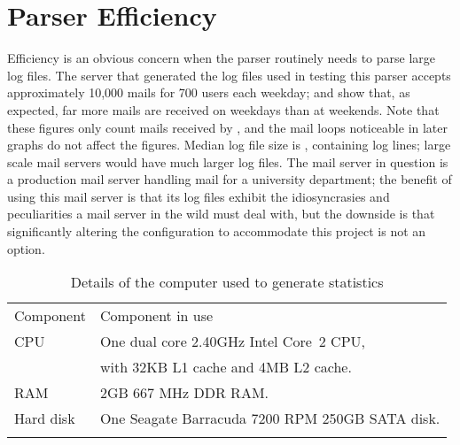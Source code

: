 \section{Parser Efficiency}

\label{parser efficiency}

Efficiency is an obvious concern when the parser routinely needs to parse
large log files.  The server that generated the log files used in testing
this parser accepts approximately 10,000 mails for 700 users each weekday;
 and  show that, as expected, far more mails are received on
weekdays than at weekends.  Note that these figures only count mails
received by , and the mail loops noticeable in later graphs
do not affect the figures.  Median log file size is
, containing
 log lines; large scale
mail servers would have much larger log files.  The mail server in question
is a production mail server handling mail for a university department; the
benefit of using this mail server is that its log files exhibit the
idiosyncrasies and peculiarities a mail server in the wild must deal with,
but the downside is that significantly altering the configuration to
accommodate this project is not an option.



\begin{table}[thbp]
    \caption{Details of the computer used to generate statistics}
    \empty{}\label{Details of the computer used to generate statistics}
    \centering{}
    \begin{tabular}[]{ll}
        \tabletopline{}%
        Component  & Component in use                                   \\
        \tablemiddleline{}%
        CPU         & One dual core 2.40GHz Intel\textregistered{}
                        Core\texttrademark{}~2 CPU,                     \\
                    & with 32KB L1 cache and 4MB L2 cache.              \\
        RAM         & 2GB 667 MHz DDR RAM\@.                            \\
        Hard disk   & One Seagate Barracuda 7200 RPM 250GB SATA disk.   \\
        \tablebottomline{}%
    \end{tabular}
\end{table}

